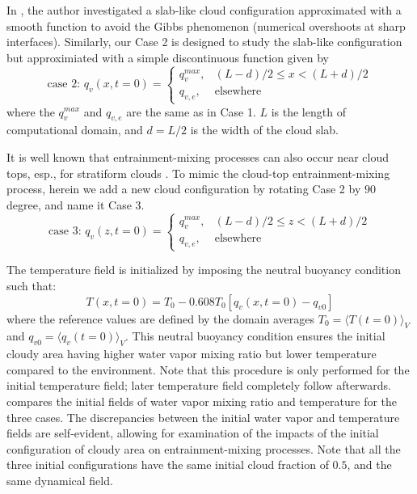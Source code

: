 In \cite{Kumar11}, the author investigated a slab-like cloud configuration approximated with a smooth function to avoid the Gibbs phenomenon (numerical overshoots at sharp interfaces). Similarly, our Case 2 is designed to study the slab-like configuration but approximiated with a simple discontinuous function given by
\begin{equation}
\mbox{case 2: } q_v(x,t=0) = 
\left\{\begin{array}{lr}
q_v^{max}, & (L-d)/2 \le x < (L+d)/2\\
q_{v,e}, & \mbox{elsewhere}
\end{array}\right.\label{case2}
\end{equation}
where the $q_v^{max}$ and $q_{v,e}$ are the same as in Case 1.
$L$ is the length of computational domain, and $d = L/2$ is the width of the cloud slab.

It is well known that entrainment-mixing processes can also occur near cloud tops, esp., for stratiform clouds \cite{Lu2011, Yum2015}. To mimic the cloud-top entrainment-mixing process, herein we add a new cloud configuration by rotating Case 2 by $90$ degree, and name it Case 3.
\begin{equation}
\mbox{case 3: } q_v(z,t=0) = 
\left\{\begin{array}{lr}
q_v^{max}, & (L-d)/2 \le z < (L+d)/2\\
q_{v,e}, & \mbox{elsewhere}
\end{array}\right.\label{case3}
\end{equation}

The temperature field is initialized by imposing the neutral buoyancy condition \cite{Kumar14} such that:
\begin{equation}
T(x,t = 0) = T_0 - 0.608T_0[q_v(x,t = 0) - q_{v0}]
\end{equation}
where the reference values are defined by the domain averages $T_0 = \langle T(t=0)\rangle_V$ and $q_{v0} = \langle q_v(t=0)\rangle_V$. This neutral buoyancy condition ensures the initial cloudy area having higher water vapor mixing ratio but lower temperature compared to the environment. Note that this procedure is only performed for the initial temperature field; later temperature field completely follow  afterwards.  compares the initial fields of water vapor 
mixing ratio and temperature for the three cases. The discrepancies between the initial water vapor 
and temperature fields are self-evident, allowing for examination of the impacts of the initial 
configuration of cloudy area on entrainment-mixing processes. Note that all the three initial 
configurations have the same initial cloud fraction of $0.5$, and the same dynamical field.

